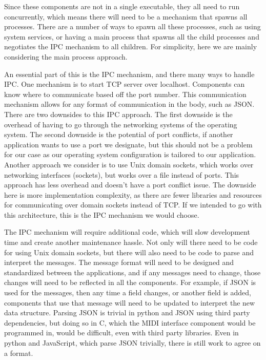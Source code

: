 Since these components are not in a single executable, they all need to run concurrently,
which means there will need to be a mechanism that spawns all processes. There are a
number of ways to spawn all these processes, such as using system services, or having a
main process that spawns all the child processes and negotiates the IPC mechanism to all
children. For simplicity, here we are mainly considering the main process approach.

An essential part of this is the IPC mechanism, and there many ways to handle IPC. One
mechanism is to start TCP server over localhost. Components can know where to communicate
based off the port number. This communication mechanism allows for any format of
communication in the body, such as JSON. There are two downsides to this IPC approach. The
first downside is the overhead of having to go through the networking systems of the
operating system. The second downside is the potential of port conflicts, if another
application wants to use a port we designate, but this should not be a problem for our
case as our operating system configuration is tailored to our application. Another
approach we consider is to use Unix domain sockets, which works over networking interfaces
(sockets), but works over a file instead of ports. This approach has less overhead and
doesn't have a port conflict issue. The downside here is more implementation complexity,
as there are fewer libraries and resources for communicating over domain sockets instead of
TCP. If we intended to go with this architecture, this is the IPC mechanism we would
choose.

The IPC mechanism will require additional code, which will slow development time and
create another maintenance hassle. Not only will there need to be code for using Unix
domain sockets, but there will also need to be code to parse and interpret the messages.
The message format will need to be designed and standardized between the applications, and
if any messages need to change, those changes will need to be reflected in all the
components. For example, if JSON is used for the messages, then any time a field changes,
or another field is added, components that use that message will need to be updated to
interpret the new data structure. Parsing JSON is trivial in python and JSON using third
party dependencies, but doing so in C, which the MIDI interface component would be
programmed in, would be difficult, even with third party libraries. Even in python and
JavaScript, which parse JSON trivially, there is still work to agree on a format.

